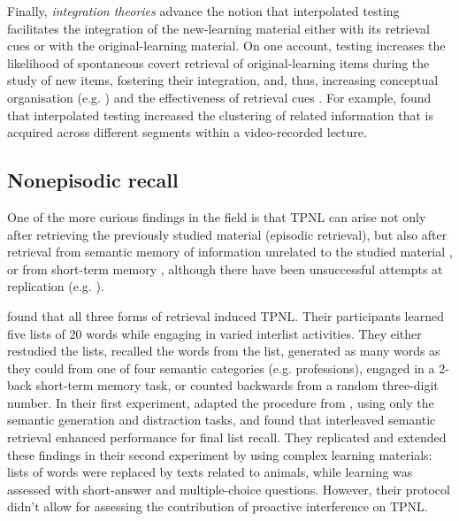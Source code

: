 \documentclass[../main.tex]{subfiles}
\begin{document}
Finally, \textit{integration theories} advance the notion that interpolated testing facilitates the integration of the new-learning material either with its retrieval cues or with the original-learning material. On one account, testing increases the likelihood of spontaneous covert retrieval of original-learning items during the study of new items, fostering their integration, and, thus, increasing conceptual organisation (e.g. \citealp{jingInterpolatedTestingInfluences2016}) and the effectiveness of retrieval cues \citep{pycWhyTestingImproves2010}. For example, \cite{jingInterpolatedTestingInfluences2016} found that interpolated testing increased the clustering of related information that is acquired across different segments within a video-recorded lecture.

\subsection*{Nonepisodic recall}

One of the more curious findings in the field is that TPNL can arise not only after retrieving the previously studied material (episodic retrieval), but also after retrieval from semantic memory of information unrelated to the studied material \citep{divisRetrievalSpeedsContext2014, pastotterRetrievalLearningFacilitates2011}, or from short-term memory \citep{pastotterRetrievalLearningFacilitates2011}, although there have been unsuccessful attempts at replication (e.g. \citealp{weinsteinNotAllRetrieval2015}).

\cite{pastotterRetrievalLearningFacilitates2011} found that all three forms of retrieval induced TPNL. Their participants learned five lists of 20 words while engaging in varied interlist activities. They either restudied the lists, recalled the words from the list, generated as many words as they could from one of four semantic categories (e.g. professions), engaged in a 2-back short-term memory task, or counted backwards from a random three-digit number. In their first experiment, \cite{divisRetrievalSpeedsContext2014} adapted the procedure from \cite{pastotterRetrievalLearningFacilitates2011}, using only the semantic generation and distraction tasks, and found that interleaved semantic retrieval enhanced performance for final list recall. They replicated and extended these findings in their second experiment by using complex learning materials: lists of words were replaced by texts related to animals, while learning was assessed with short-answer and multiple-choice questions. However, their protocol didn't allow for assessing the contribution of proactive interference on TPNL.
\end{document}
